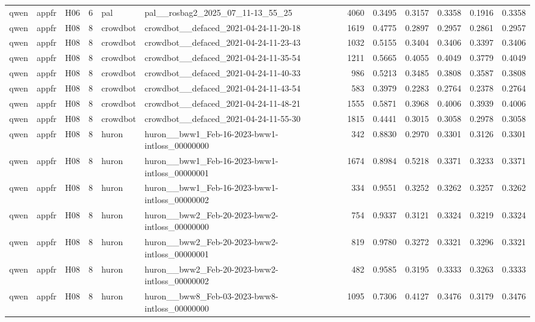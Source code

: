\begin{table}[tbp]
\begin{tabular}{lllrllrrrrrr}
qwen & appfr & H06 & 6 & pal & pal\_\_rosbag2\_2025\_07\_11-13\_55\_25 & 4060 & 0.3495 & 0.3157 & 0.3358 & 0.1916 & 0.3358 \\
qwen & appfr & H08 & 8 & crowdbot & crowdbot\_\_defaced\_2021-04-24-11-20-18 & 1619 & 0.4775 & 0.2897 & 0.2957 & 0.2861 & 0.2957 \\
qwen & appfr & H08 & 8 & crowdbot & crowdbot\_\_defaced\_2021-04-24-11-23-43 & 1032 & 0.5155 & 0.3404 & 0.3406 & 0.3397 & 0.3406 \\
qwen & appfr & H08 & 8 & crowdbot & crowdbot\_\_defaced\_2021-04-24-11-35-54 & 1211 & 0.5665 & 0.4055 & 0.4049 & 0.3779 & 0.4049 \\
qwen & appfr & H08 & 8 & crowdbot & crowdbot\_\_defaced\_2021-04-24-11-40-33 & 986 & 0.5213 & 0.3485 & 0.3808 & 0.3587 & 0.3808 \\
qwen & appfr & H08 & 8 & crowdbot & crowdbot\_\_defaced\_2021-04-24-11-43-54 & 583 & 0.3979 & 0.2283 & 0.2764 & 0.2378 & 0.2764 \\
qwen & appfr & H08 & 8 & crowdbot & crowdbot\_\_defaced\_2021-04-24-11-48-21 & 1555 & 0.5871 & 0.3968 & 0.4006 & 0.3939 & 0.4006 \\
qwen & appfr & H08 & 8 & crowdbot & crowdbot\_\_defaced\_2021-04-24-11-55-30 & 1815 & 0.4441 & 0.3015 & 0.3058 & 0.2978 & 0.3058 \\
qwen & appfr & H08 & 8 & huron & huron\_\_bww1\_Feb-16-2023-bww1-intloss\_00000000 & 342 & 0.8830 & 0.2970 & 0.3301 & 0.3126 & 0.3301 \\
qwen & appfr & H08 & 8 & huron & huron\_\_bww1\_Feb-16-2023-bww1-intloss\_00000001 & 1674 & 0.8984 & 0.5218 & 0.3371 & 0.3233 & 0.3371 \\
qwen & appfr & H08 & 8 & huron & huron\_\_bww1\_Feb-16-2023-bww1-intloss\_00000002 & 334 & 0.9551 & 0.3252 & 0.3262 & 0.3257 & 0.3262 \\
qwen & appfr & H08 & 8 & huron & huron\_\_bww2\_Feb-20-2023-bww2-intloss\_00000000 & 754 & 0.9337 & 0.3121 & 0.3324 & 0.3219 & 0.3324 \\
qwen & appfr & H08 & 8 & huron & huron\_\_bww2\_Feb-20-2023-bww2-intloss\_00000001 & 819 & 0.9780 & 0.3272 & 0.3321 & 0.3296 & 0.3321 \\
qwen & appfr & H08 & 8 & huron & huron\_\_bww2\_Feb-20-2023-bww2-intloss\_00000002 & 482 & 0.9585 & 0.3195 & 0.3333 & 0.3263 & 0.3333 \\
qwen & appfr & H08 & 8 & huron & huron\_\_bww8\_Feb-03-2023-bww8-intloss\_00000000 & 1095 & 0.7306 & 0.4127 & 0.3476 & 0.3179 & 0.3476 \\

\end{tabular}
\end{table}
